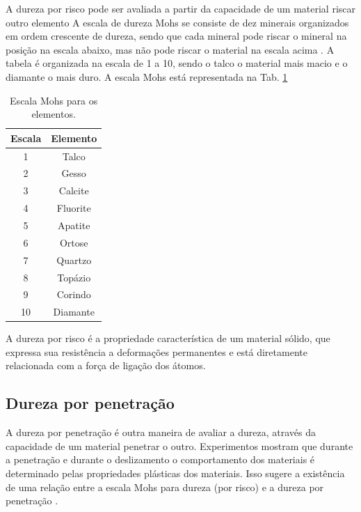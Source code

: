 \documentclass[
12pt,
openany, %
oneside, %
a4paper,			
english,			
brazil			        %
]{abntbibufjf}
\begin{document}
	A dureza por risco pode ser avaliada a partir da capacidade de um material riscar outro elemento
	A escala de dureza Mohs se consiste de dez minerais organizados em ordem crescente de dureza, sendo que cada mineral pode riscar o mineral na posição na escala abaixo, mas não pode riscar o material na escala acima \cite{tabor1953mohs}. A tabela é organizada na escala de 1 a 10, sendo o talco o material mais macio e o diamante o mais duro. A escala Mohs está representada na Tab. \ref{tab:mohs}

	\begin{table}[H]
	\centering
	\caption{Escala Mohs para os elementos.}
	\begin{tabular}{|c|c|}
		\hline
		\textbf{Escala} & \textbf{Elemento} \bigstrut\\
		\hline
		1          & Talco \bigstrut\\
		\hline
		2          & Gesso \bigstrut\\
		\hline
		3          & Calcite \bigstrut\\
		\hline
		4          & Fluorite \bigstrut\\
		\hline
		5          & Apatite \bigstrut\\
		\hline
		6          & Ortose \bigstrut\\
		\hline
		7          & Quartzo \bigstrut\\
		\hline
		8          & Topázio \bigstrut\\
		\hline
		9          & Corindo \bigstrut\\
		\hline
		10         & Diamante \bigstrut\\
		\hline
	\end{tabular}%
	\label{tab:mohs}%
	\end{table}%

	A dureza por risco é a propriedade característica de um material sólido, que expressa sua resistência a deformações permanentes e está diretamente relacionada com a força de ligação dos átomos.

\subsection{Dureza por penetração}

	A dureza por penetração é outra maneira de avaliar a dureza, através da capacidade de um material penetrar o outro. Experimentos mostram que durante a penetração e durante o deslizamento o comportamento dos materiais é determinado pelas propriedades plásticas dos materiais. Isso sugere a existência de uma relação entre a escala Mohs para dureza (por risco) e a dureza por penetração \cite{tabor1953mohs}.
\end{document}
